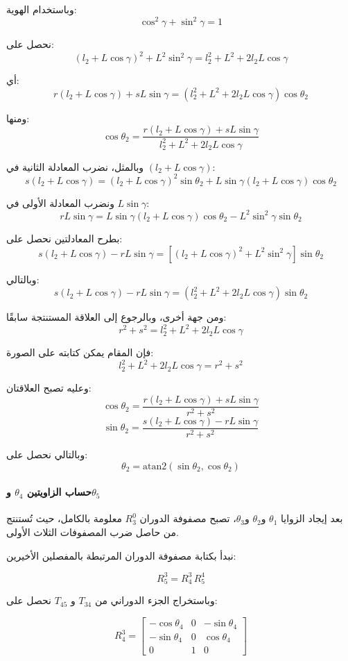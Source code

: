 وباستخدام الهوية:
\[
\cos^2\gamma+\sin^2\gamma=1
\]

نحصل على:
\[
(l_2+L\cos\gamma)^2+L^2\sin^2\gamma
=
l_2^2+L^2+2l_2L\cos\gamma
\]

أي:
\[
r(l_2+L\cos\gamma)+sL\sin\gamma
=
\left(l_2^2+L^2+2l_2L\cos\gamma\right)\cos\theta_2
\]

ومنها:
\[
\cos\theta_2 =
\frac{r(l_2+L\cos\gamma)+sL\sin\gamma}
{l_2^2+L^2+2l_2L\cos\gamma}
\]

وبالمثل، نضرب المعادلة الثانية في $(l_2+L\cos\gamma)$:
\[
s(l_2+L\cos\gamma)
=
(l_2+L\cos\gamma)^2\sin\theta_2
+
L\sin\gamma(l_2+L\cos\gamma)\cos\theta_2
\]

ونضرب المعادلة الأولى في $L\sin\gamma$:
\[
rL\sin\gamma
=
L\sin\gamma(l_2+L\cos\gamma)\cos\theta_2
-
L^2\sin^2\gamma\sin\theta_2
\]

بطرح المعادلتين نحصل على:
\[
s(l_2+L\cos\gamma)-rL\sin\gamma
=
\left[(l_2+L\cos\gamma)^2+L^2\sin^2\gamma\right]\sin\theta_2
\]

وبالتالي:
\[
s(l_2+L\cos\gamma)-rL\sin\gamma
=
\left(l_2^2+L^2+2l_2L\cos\gamma\right)\sin\theta_2
\]

ومن جهة أخرى، وبالرجوع إلى العلاقة المستنتجة سابقًا:
\[
r^2+s^2=l_2^2+L^2+2l_2L\cos\gamma
\]

فإن المقام يمكن كتابته على الصورة:
\[
l_2^2+L^2+2l_2L\cos\gamma = r^2+s^2
\]

وعليه تصبح العلاقتان:
\[
\cos\theta_2 =
\frac{r(l_2+L\cos\gamma)+sL\sin\gamma}
{r^2+s^2}
\]
\[
\sin\theta_2 =
\frac{s(l_2+L\cos\gamma)-rL\sin\gamma}
{r^2+s^2}
\]

وبالتالي نحصل على:
\[
\theta_2=
\mathrm{atan2}\left(\sin\theta_2,\cos\theta_2\right)
\]

\paragraph{حساب الزاويتين $\theta_4$ و$\theta_5$}

بعد إيجاد الزوايا $\theta_1$ و$\theta_2$ و$\theta_3$، تصبح مصفوفة الدوران $R_3^0$ معلومة بالكامل، حيث تُستنتج من حاصل ضرب المصفوفات الثلاث الأولى.

نبدأ بكتابة مصفوفة الدوران المرتبطة بالمفصلين الأخيرين:

\begin{equation}
R_5^3 = R_4^3 \, R_5^4
\tag{1}
\end{equation}

وباستخراج الجزء الدوراني من $T_{34}$ و $T_{45}$ نحصل على:

\[
R_4^3 =
\begin{bmatrix}
- \cos\theta_4 & 0 & - \sin\theta_4 \\
- \sin\theta_4 & 0 & \cos\theta_4 \\
0 & 1 & 0
\end{bmatrix}
\]

